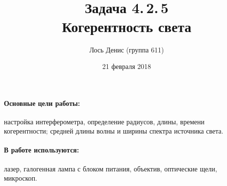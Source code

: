 \documentclass[12pt]{article}
\title{{\bf Задача 4.\,2.\,5 \\ Когерентность света}}
\author{Лось Денис (группа 611)}
\date{21 февраля 2018}
\begin{document}
\maketitle

\paragraph{Основные цели работы: } настройка интерферометра, определение радиусов, длины, времени когерентности; средней длины волны и ширины спектра источника света.

\paragraph{В  работе используются: } лазер, галогенная лампа с блоком питания, объектив, оптические щели, микроскоп.
\end{document}
